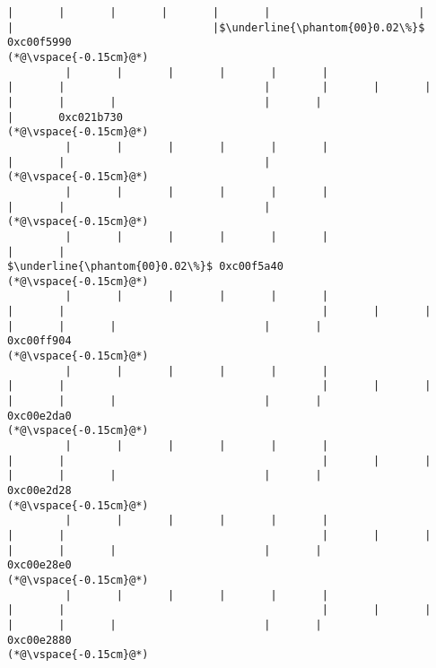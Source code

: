 \begin{lstlisting}[caption=NewDirectByteBuffer, label=profile:C2JNewDirectBuffer-512, numberbychapter=true, frame=lines, float, floatplacement=t]
         |       |       |       |       |       |                       |       |                               |$\underline{\phantom{00}0.02\%}$ 0xc00f5990
(*@\vspace{-0.15cm}@*)
         |       |       |       |       |       |                       |       |                               |        |       |       |       |       |       |                       |       |                               |       0xc021b730
(*@\vspace{-0.15cm}@*)
         |       |       |       |       |       |                       |       |                               |
(*@\vspace{-0.15cm}@*)
         |       |       |       |       |       |                       |       |                               |
(*@\vspace{-0.15cm}@*)
         |       |       |       |       |       |                       |       |                                $\underline{\phantom{00}0.02\%}$ 0xc00f5a40
(*@\vspace{-0.15cm}@*)
         |       |       |       |       |       |                       |       |                                        |       |       |       |       |       |                       |       |                                       0xc00ff904
(*@\vspace{-0.15cm}@*)
         |       |       |       |       |       |                       |       |                                        |       |       |       |       |       |                       |       |                                       0xc00e2da0
(*@\vspace{-0.15cm}@*)
         |       |       |       |       |       |                       |       |                                        |       |       |       |       |       |                       |       |                                       0xc00e2d28
(*@\vspace{-0.15cm}@*)
         |       |       |       |       |       |                       |       |                                        |       |       |       |       |       |                       |       |                                       0xc00e28e0
(*@\vspace{-0.15cm}@*)
         |       |       |       |       |       |                       |       |                                        |       |       |       |       |       |                       |       |                                       0xc00e2880
(*@\vspace{-0.15cm}@*)

\end{lstlisting}
